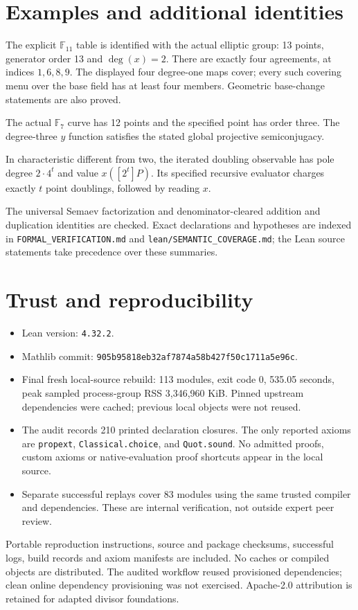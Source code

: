 \documentclass[11pt,a4paper]{article}
\begin{document}
\section*{Examples and additional identities}
\begin{description}[style=nextline]
\item[E1 and E2 Sharp agreement and menu examples]
The explicit $\mathbb F_{11}$ table is identified with the actual elliptic group: 13 points, generator order 13 and $\deg(x)=2$. There are exactly four agreements, at indices $1,6,8,9$. The displayed four degree-one maps cover; every such covering menu over the base field has at least four members. Geometric base-change statements are also proved.
\item[E3 Characteristic seven example]
The actual $\mathbb F_7$ curve has 12 points and the specified point has order three. The degree-three $y$ function satisfies the stated global projective semiconjugacy.
\item[E4 Degree and evaluation cost]
In characteristic different from two, the iterated doubling observable has pole degree $2\cdot4^t$ and value $x([2^t]P)$. Its specified recursive evaluator charges exactly $t$ point doublings, followed by reading $x$.
\end{description}
The universal Semaev factorization and denominator-cleared addition and duplication identities are checked. Exact declarations and hypotheses are indexed in \texttt{FORMAL\_VERIFICATION.md} and \texttt{lean/SEMANTIC\_COVERAGE.md}; the Lean source statements take precedence over these summaries.

\section*{Trust and reproducibility}
\begin{itemize}
\item Lean version: \texttt{4.32.2}.
\item Mathlib commit: \texttt{905b95818eb32af7874a58b427f50c1711a5e96c}.
\item Final fresh local-source rebuild: 113 modules, exit code 0, 535.05 seconds, peak sampled process-group RSS 3,346,960 KiB. Pinned upstream dependencies were cached; previous local objects were not reused.
\item The audit records 210 printed declaration closures. The only reported axioms are \texttt{propext}, \texttt{Classical.choice}, and \texttt{Quot.sound}. No admitted proofs, custom axioms or native-evaluation proof shortcuts appear in the local source.
\item Separate successful replays cover 83 modules using the same trusted compiler and dependencies. These are internal verification, not outside expert peer review.
\end{itemize}
Portable reproduction instructions, source and package checksums, successful logs, build records and axiom manifests are included. No caches or compiled objects are distributed. The audited workflow reused provisioned dependencies; clean online dependency provisioning was not exercised. Apache-2.0 attribution is retained for adapted divisor foundations.
\end{document}
